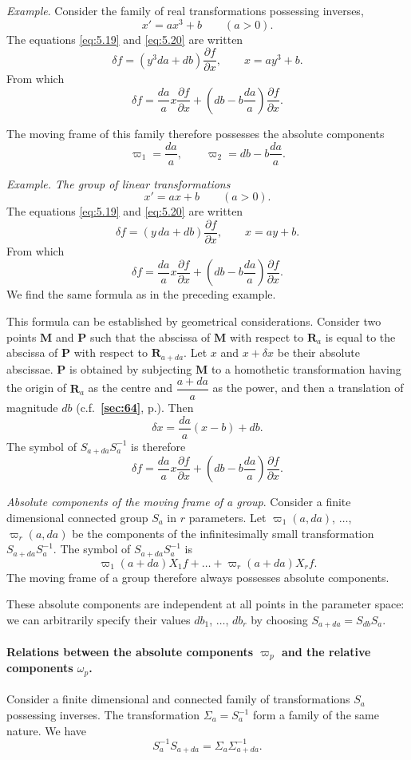 \documentclass[leqno,11pt]{book}
\numberwithin{equation}{chapter}
\newcommand{\pd}{\partial}
\theoremstyle{shape1}
\theoremstyle{shapesmall}
\newcommand{\fsref}[1]{{\rm\textsection\textbf{\ref{sec:#1}}}}
\newcommand{\vp}{\varpi}
\newcommand{\somespace}{\vspace{9pt}}
\begin{document}
{\small
\emph{Example}. Consider the family of real transformations possessing inverses,
\[
x'=ax^{3}+b\qquad (a>0).
\]
The equations \eqref{eq:5.19} and \eqref{eq:5.20} are written
\[
\delta f=(y^{3}da+db)\frac{\pd f}{\pd x},\qquad x=ay^{3}+b.
\]
From which
\[
\delta f=\frac{da}{a}x\frac{\pd f}{\pd x}+\left(db-b\frac{da}{a}\right)\frac{\pd f}{\pd x}.
\]

The moving frame of this family therefore possesses the absolute components
\[
\vp_{1}=\frac{da}{a},\qquad\vp_{2}=db-b\frac{da}{a}.
\]

\somespace

\emph{Example. The group of linear transformations}
\[
x'=ax+b\qquad(a>0).
\]
The equations \eqref{eq:5.19} and \eqref{eq:5.20} are written
\[
\delta f=(y\,da+db)\frac{\pd f}{\pd x},\qquad x=ay+b.
\]
From which
\[
\delta f=\frac{da}{a}x\frac{\pd f}{\pd x}+\left(db-b\frac{da}{a}\right)\frac{\pd f}{\pd x}.
\]
We find the same formula as in the preceding example.

This formula can be established by geometrical considerations. Consider two points $\mathbf{M}$ and $\mathbf{P}$ such that the abscissa of $\mathbf{M}$ with respect to $\mathbf{R}_{a}$ is equal to the abscissa of $\mathbf{P}$ with respect to $\mathbf{R}_{a+da}$. Let $x$ and $x+\delta x$ be their absolute abscissae. $\mathbf{P}$ is obtained by subjecting $\mathbf{M}$ to a homothetic transformation having the origin of $\mathbf{R}_{a}$ as the centre and $\dfrac{a+da}{a}$ as the power, and then a translation of magnitude $db$ (c.f.~\fsref{64}, p.\pageref{sec:64}). Then
\[
\delta x=\frac{da}{a}(x-b)+db.
\]
The symbol of $S_{a+da}S_{a}^{-1}$ is therefore
\[
\delta f=\frac{da}{a}x\frac{\pd f}{\pd x}+\left(db-b\frac{da}{a}\right)\frac{\pd f}{\pd x}.
\]
}

\emph{Absolute components of the moving frame of a group}. Consider a finite dimensional connected group $S_{a}$ in $r$ parameters. Let $\vp_{1}(a,da)$, $\dots$, $\vp_{r}(a,da)$ be the components of the infinitesimally small transformation $S_{a+da}S_{a}^{-1}$. The symbol of $S_{a+da}S_{a}^{-1}$ is
\[
\vp_{1}(a+da)X_{1}f+\dots+\vp_{r}(a+da)X_{r}f.
\]
The moving frame of a group therefore always possesses absolute components.

These absolute components are independent at all points in the parameter space: we can arbitrarily specify their values $db_{1}$, $\dots$, $db_{r}$ by choosing $S_{a+da}=S_{db}S_{a}$.

\paragraph{Relations between the absolute components $\vp_p$ and the relative components $\omega_p$.}
\label{sec:75}
Consider a finite dimensional and connected family of transformations $S_{a}$ possessing inverses. The transformation $\Sigma_{a}=S_{a}^{-1}$ form a family of the same nature. We have
\[
S_{a}^{-1}S_{a+da}=\Sigma_{a}\Sigma_{a+da}^{-1}.
\]
\end{document}
